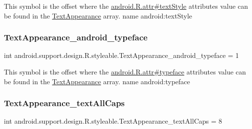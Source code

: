 This symbol is the offset where the \hyperlink{}{android.\+R.\+attr\#text\+Style} attribute\textquotesingle{}s value can be found in the \hyperlink{classandroid_1_1support_1_1design_1_1R_1_1styleable_a23dc46ec989f92f528b46568dad7e726}{Text\+Appearance} array.  name android\+:text\+Style \mbox{\label{classandroid_1_1support_1_1design_1_1R_1_1styleable_ab0453bf31379b054bdb8f41d7d5ec54b}} 
\subsubsection{\texorpdfstring{Text\+Appearance\+\_\+android\+\_\+typeface}{TextAppearance\_android\_typeface}}
{\footnotesize\ttfamily int android.\+support.\+design.\+R.\+styleable.\+Text\+Appearance\+\_\+android\+\_\+typeface = 1\hspace{0.3cm}{\ttfamily [static]}}

This symbol is the offset where the \hyperlink{}{android.\+R.\+attr\#typeface} attribute\textquotesingle{}s value can be found in the \hyperlink{classandroid_1_1support_1_1design_1_1R_1_1styleable_a23dc46ec989f92f528b46568dad7e726}{Text\+Appearance} array.  name android\+:typeface \mbox{\label{classandroid_1_1support_1_1design_1_1R_1_1styleable_ae246508ce6dc881e48a667cda664ad04}} 
\subsubsection{\texorpdfstring{Text\+Appearance\+\_\+text\+All\+Caps}{TextAppearance\_textAllCaps}}
{\footnotesize\ttfamily int android.\+support.\+design.\+R.\+styleable.\+Text\+Appearance\+\_\+text\+All\+Caps = 8\hspace{0.3cm}{\ttfamily [static]}}

